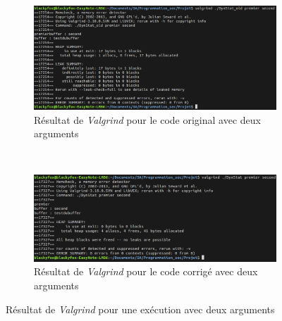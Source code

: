 \begin{figure}[H]
  \begin{subfigure}[b]{0.45\textwidth}
    \includegraphics[width=\textwidth]{img/conc7.png}
    \caption{Résultat de \textit{Valgrind} pour le code original avec deux arguments}
  \end{subfigure}
  ~
  \begin{subfigure}[b]{0.45\textwidth}
    \includegraphics[width=\textwidth]{img/conc8.png}
    \caption{Résultat de \textit{Valgrind} pour le code corrigé avec deux arguments}
  \end{subfigure}
  \caption{Résultat de \textit{Valgrind} pour une exécution avec deux arguments}
\end{figure}

